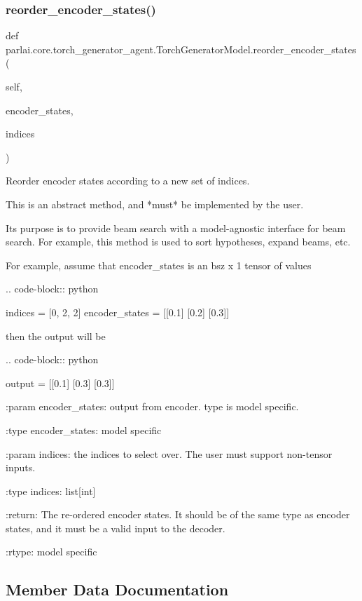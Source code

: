 \subsubsection{\texorpdfstring{reorder\+\_\+encoder\+\_\+states()}{reorder\_encoder\_states()}}
{\footnotesize\ttfamily def parlai.\+core.\+torch\+\_\+generator\+\_\+agent.\+Torch\+Generator\+Model.\+reorder\+\_\+encoder\+\_\+states (\begin{DoxyParamCaption}\item[{}]{self,  }\item[{}]{encoder\+\_\+states,  }\item[{}]{indices }\end{DoxyParamCaption})}

\begin{DoxyVerb}Reorder encoder states according to a new set of indices.

This is an abstract method, and *must* be implemented by the user.

Its purpose is to provide beam search with a model-agnostic interface for
beam search. For example, this method is used to sort hypotheses,
expand beams, etc.

For example, assume that encoder_states is an bsz x 1 tensor of values

.. code-block:: python

    indices = [0, 2, 2]
    encoder_states = [[0.1]
              [0.2]
              [0.3]]

then the output will be

.. code-block:: python

    output = [[0.1]
      [0.3]
      [0.3]]

:param encoder_states:
    output from encoder. type is model specific.

:type encoder_states:
    model specific

:param indices:
    the indices to select over. The user must support non-tensor
    inputs.

:type indices: list[int]

:return:
    The re-ordered encoder states. It should be of the same type as
    encoder states, and it must be a valid input to the decoder.

:rtype:
    model specific
\end{DoxyVerb}
 

\subsection{Member Data Documentation}
\mbox{\label{classparlai_1_1core_1_1torch__generator__agent_1_1TorchGeneratorModel_a1d9cfef6046368b5e7b77bc44b13473e}} 
